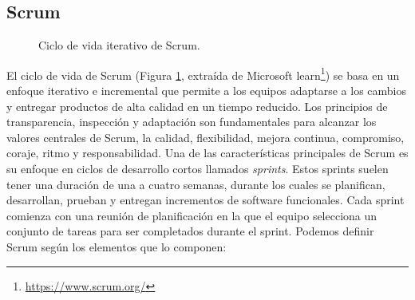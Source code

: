 \subsection{Scrum}

\begin{figure}[H]
    \caption{Ciclo de vida iterativo de Scrum.}
    \label{fig:scrum_ciclo_vida}
\end{figure}
El ciclo de vida de Scrum (Figura \ref{fig:scrum_ciclo_vida}, extraída de Microsoft learn\footnote{\url{https://www.scrum.org/}}) se basa en un enfoque iterativo e incremental que permite a los equipos adaptarse a los cambios y entregar productos de alta calidad en un tiempo reducido. Los principios de transparencia, inspección y adaptación son fundamentales para alcanzar los valores centrales de Scrum, la calidad, flexibilidad, mejora continua, compromiso, coraje, ritmo y responsabilidad. 
Una de las características principales de Scrum es su enfoque en ciclos de desarrollo cortos llamados \emph{sprints}. Estos sprints suelen tener una duración de una a cuatro semanas, durante los cuales se planifican, desarrollan, prueban y entregan incrementos de software funcionales. Cada sprint comienza con una reunión de planificación en la que el equipo selecciona un conjunto de tareas para ser completados durante el sprint. Podemos definir Scrum según los elementos que lo componen:

